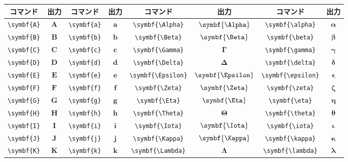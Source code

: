 \begin{longtable}{cccccccc}
    \toprule
    コマンド         & 出力          & コマンド         & 出力          & コマンド                & 出力                 & コマンド                   & 出力                    \\
    \midrule
    \verb|\symbf{A}| & \(\symbf{A}\) & \verb|\symbf{a}| & \(\symbf{a}\) & \verb|\symbf{\Alpha}|   & \(\symbf{\Alpha}\)   & \verb|\symbf{\alpha}|      & \(\symbf{\alpha}\)      \\
    \verb|\symbf{B}| & \(\symbf{B}\) & \verb|\symbf{b}| & \(\symbf{b}\) & \verb|\symbf{\Beta}|    & \(\symbf{\Beta}\)    & \verb|\symbf{\beta}|       & \(\symbf{\beta}\)       \\
    \verb|\symbf{C}| & \(\symbf{C}\) & \verb|\symbf{c}| & \(\symbf{c}\) & \verb|\symbf{\Gamma}|   & \(\symbf{\Gamma}\)   & \verb|\symbf{\gamma}|      & \(\symbf{\gamma}\)      \\
    \verb|\symbf{D}| & \(\symbf{D}\) & \verb|\symbf{d}| & \(\symbf{d}\) & \verb|\symbf{\Delta}|   & \(\symbf{\Delta}\)   & \verb|\symbf{\delta}|      & \(\symbf{\delta}\)      \\
    \verb|\symbf{E}| & \(\symbf{E}\) & \verb|\symbf{e}| & \(\symbf{e}\) & \verb|\symbf{\Epsilon}| & \(\symbf{\Epsilon}\) & \verb|\symbf{\epsilon}|    & \(\symbf{\epsilon}\)    \\
    \verb|\symbf{F}| & \(\symbf{F}\) & \verb|\symbf{f}| & \(\symbf{f}\) & \verb|\symbf{\Zeta}|    & \(\symbf{\Zeta}\)    & \verb|\symbf{\zeta}|       & \(\symbf{\zeta}\)       \\
    \verb|\symbf{G}| & \(\symbf{G}\) & \verb|\symbf{g}| & \(\symbf{g}\) & \verb|\symbf{\Eta}|     & \(\symbf{\Eta}\)     & \verb|\symbf{\eta}|        & \(\symbf{\eta}\)        \\
    \verb|\symbf{H}| & \(\symbf{H}\) & \verb|\symbf{h}| & \(\symbf{h}\) & \verb|\symbf{\Theta}|   & \(\symbf{\Theta}\)   & \verb|\symbf{\theta}|      & \(\symbf{\theta}\)      \\
    \verb|\symbf{I}| & \(\symbf{I}\) & \verb|\symbf{i}| & \(\symbf{i}\) & \verb|\symbf{\Iota}|    & \(\symbf{\Iota}\)    & \verb|\symbf{\iota}|       & \(\symbf{\iota}\)       \\
    \verb|\symbf{J}| & \(\symbf{J}\) & \verb|\symbf{j}| & \(\symbf{j}\) & \verb|\symbf{\Kappa}|   & \(\symbf{\Kappa}\)   & \verb|\symbf{\kappa}|      & \(\symbf{\kappa}\)      \\
    \verb|\symbf{K}| & \(\symbf{K}\) & \verb|\symbf{k}| & \(\symbf{k}\) & \verb|\symbf{\Lambda}|  & \(\symbf{\Lambda}\)  & \verb|\symbf{\lambda}|     & \(\symbf{\lambda}\)     \\

\end{longtable}
